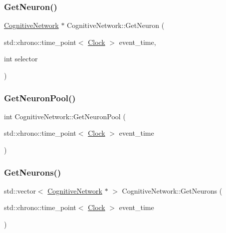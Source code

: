 \subsubsection{\texorpdfstring{Get\+Neuron()}{GetNeuron()}}
{\footnotesize\ttfamily \mbox{\hyperlink{classCognitiveNetwork}{Cognitive\+Network}} $\ast$ Cognitive\+Network\+::\+Get\+Neuron (\begin{DoxyParamCaption}\item[{std\+::chrono\+::time\+\_\+point$<$ \mbox{\hyperlink{universe_8h_a0ef8d951d1ca5ab3cfaf7ab4c7a6fd80}{Clock}} $>$}]{event\+\_\+time,  }\item[{int}]{selector }\end{DoxyParamCaption})}

\mbox{\label{classCognitiveNetwork_af81132245e486c496a055f54a5a520d0}} 
\subsubsection{\texorpdfstring{Get\+Neuron\+Pool()}{GetNeuronPool()}}
{\footnotesize\ttfamily int Cognitive\+Network\+::\+Get\+Neuron\+Pool (\begin{DoxyParamCaption}\item[{std\+::chrono\+::time\+\_\+point$<$ \mbox{\hyperlink{universe_8h_a0ef8d951d1ca5ab3cfaf7ab4c7a6fd80}{Clock}} $>$}]{event\+\_\+time }\end{DoxyParamCaption})\hspace{0.3cm}{\ttfamily [inline]}}

\mbox{\label{classCognitiveNetwork_a0e9e37e976a7ca5ee625e2d7b36fd7ea}} 
\subsubsection{\texorpdfstring{Get\+Neurons()}{GetNeurons()}}
{\footnotesize\ttfamily std\+::vector$<$ \mbox{\hyperlink{classCognitiveNetwork}{Cognitive\+Network}} $\ast$ $>$ Cognitive\+Network\+::\+Get\+Neurons (\begin{DoxyParamCaption}\item[{std\+::chrono\+::time\+\_\+point$<$ \mbox{\hyperlink{universe_8h_a0ef8d951d1ca5ab3cfaf7ab4c7a6fd80}{Clock}} $>$}]{event\+\_\+time }\end{DoxyParamCaption})}

